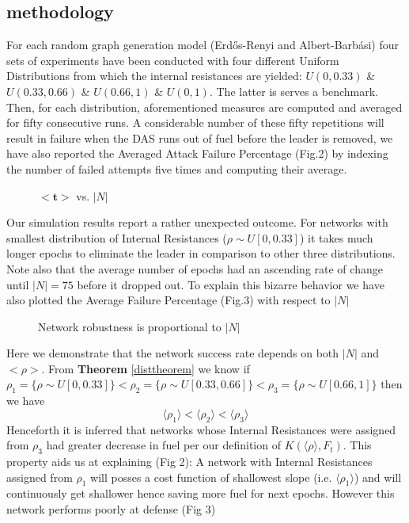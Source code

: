 \documentclass{article}
\begin{document}
	\subsection{methodology}
	  For each random graph generation model (Erd\H{o}s-Renyi and Albert-Barb\'{a}si) four sets of experiments have been conducted with four different Uniform Distributions from which the internal resistances are yielded: $U(0,0.33)$ \& $U(0.33,0.66)$ \& $U(0.66,1)$ \& $U(0,1)$. The latter is serves a benchmark. \newline Then, for each distribution, aforementioned measures are computed and averaged for fifty consecutive runs. A considerable number of these fifty repetitions will result in failure when the DAS runs out of fuel before the leader is removed, we have also reported the Averaged Attack Failure Percentage (Fig.2) by indexing the number of failed attempts five times and computing their average. \newline
	  \begin{figure}[tbh]\label{fig:2}
	  	\centering
	  	
	  	\caption{$<\textbf{t}>$ vs. $|N|$}
	  \end{figure} \newline
	  Our simulation results report a rather unexpected outcome. For networks with smallest distribution of Internal Resistances ($\rho \sim U[0,0.33]$) it takes much longer epochs to eliminate the leader in comparison to other three distributions. Note also that the average number of epochs had an ascending rate of change until $|N|=75$ before it dropped out. To explain this bizarre behavior we have also plotted the Average Failure Percentage (Fig.3) with respect to $|N|$ 
	  \begin{figure}
	  	\centering
	  	
	  	\caption{Network robustness is proportional to $|N|$}
	  \end{figure} \newline
	  Here we demonstrate that the network success rate depends on both $|N|$ and $<\rho>$. From \textbf{Theorem} \ref{disttheorem} we know if $\rho_1 = \{\rho \sim U[0,0.33] \} < \rho_2 = \{\rho \sim U[0.33,0.66] \} < \rho_3 = \{\rho \sim U[0.66,1] \}$ then we have
	  \begin{equation*}
	  	\langle \rho_1 \rangle < \langle \rho_2 \rangle < \langle \rho_3 \rangle
	  \end{equation*}
	   Henceforth it is inferred that networks whose Internal Resistances were assigned from $\rho_3$ had greater decrease in fuel per our definition of $K(\langle \rho \rangle,F_{t})$. This property aids us at explaining (Fig 2): A network with Internal Resistances assigned from $\rho_1$ will posses a cost function of shallowest slope (i.e. $\langle \rho_1 \rangle$) and will continuously get shallower hence saving more fuel for next epochs. However this network performs poorly at defense (Fig 3)
	\pagebreak
	
	
\end{document}
